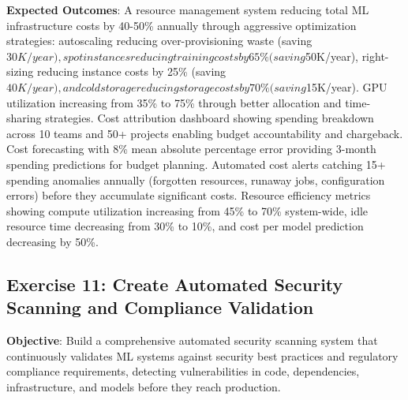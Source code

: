 \textbf{Expected Outcomes}: A resource management system reducing total ML infrastructure costs by 40-50\% annually through aggressive optimization strategies: autoscaling reducing over-provisioning waste (saving $30K/year), spot instances reducing training costs by 65\% (saving $50K/year), right-sizing reducing instance costs by 25\% (saving $40K/year), and cold storage reducing storage costs by 70\% (saving $15K/year). GPU utilization increasing from 35\% to 75\% through better allocation and time-sharing strategies. Cost attribution dashboard showing spending breakdown across 10 teams and 50+ projects enabling budget accountability and chargeback. Cost forecasting with 8\% mean absolute percentage error providing 3-month spending predictions for budget planning. Automated cost alerts catching 15+ spending anomalies annually (forgotten resources, runaway jobs, configuration errors) before they accumulate significant costs. Resource efficiency metrics showing compute utilization increasing from 45\% to 70\% system-wide, idle resource time decreasing from 30\% to 10\%, and cost per model prediction decreasing by 50\%.

\subsection{Exercise 11: Create Automated Security Scanning and Compliance Validation}

\textbf{Objective}: Build a comprehensive automated security scanning system that continuously validates ML systems against security best practices and regulatory compliance requirements, detecting vulnerabilities in code, dependencies, infrastructure, and models before they reach production.

